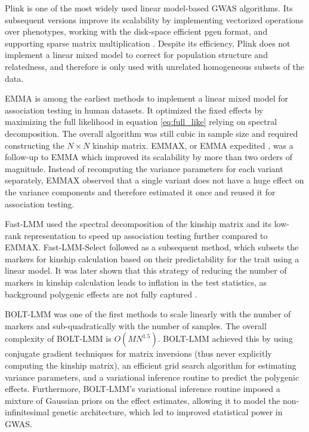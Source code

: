 Plink \cite{purcell2007plink} is one of the most widely used linear model-based GWAS algorithms. Its subsequent versions \cite{chang2015second} improve its scalability by implementing vectorized operations over phenotypes, working with the disk-space efficient pgen format, and supporting sparse matrix multiplication \cite{rivas2024efficient}. Despite its efficiency, Plink does not implement a linear mixed model to correct for population structure and relatedness, and therefore is only used with unrelated homogeneous subsets of the data.

EMMA \cite{kang2008efficient} is among the earliest methods to implement a linear mixed model for association testing in human datasets. It optimized the fixed effects by maximizing the full likelihood in equation \ref{eq:full_like} relying on spectral decomposition. The overall algorithm was still cubic in sample size and required constructing the \(N \times N\) kinship matrix. EMMAX, or EMMA expedited \cite{kang2010variance}, was a follow-up to EMMA which improved its scalability by more than two orders of magnitude. Instead of recomputing the variance parameters for each variant separately, EMMAX observed that a single variant does not have a huge effect on the variance components and therefore estimated it once and reused it for association testing.

Fast-LMM \cite{lippert2011fast} used the spectral decomposition of the kinship matrix and its low-rank representation to speed up association testing further compared to EMMAX. Fast-LMM-Select \cite{listgarten2013fast} followed as a subsequent method, which subsets the markers for kinship calculation based on their predictability for the trait using a linear model. It was later shown that this strategy of reducing the number of markers in kinship calculation leads to inflation in the test statistics, as background polygenic effects are not fully captured \cite{yang2014advantages}.

BOLT-LMM \cite{loh2015efficient,loh2018mixed} was one of the first methods to scale linearly with the number of markers and sub-quadratically with the number of samples. The overall complexity of BOLT-LMM is \(O(MN^{1.5})\). BOLT-LMM achieved this by using conjugate gradient techniques for matrix inversions (thus never explicitly computing the kinship matrix), an efficient grid search algorithm for estimating variance parameters, and a variational inference routine to predict the polygenic effects. Furthermore, BOLT-LMM's variational inference routine imposed a mixture of Gaussian priors on the effect estimates, allowing it to model the non-infinitesimal genetic architecture, which led to improved statistical power in GWAS.

